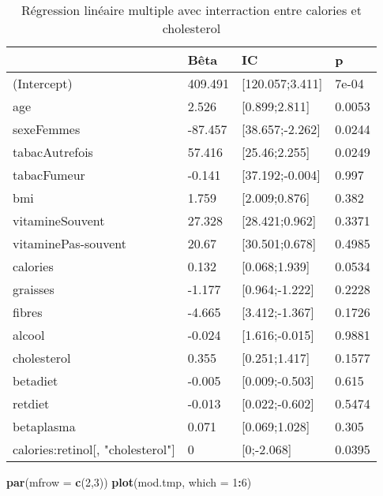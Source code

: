 \documentclass[]{article}
\newenvironment{Shaded}{\begin{snugshade}}{\end{snugshade}}
\newcommand{\KeywordTok}[1]{\textcolor[rgb]{0.13,0.29,0.53}{\textbf{#1}}}
\newcommand{\DataTypeTok}[1]{\textcolor[rgb]{0.13,0.29,0.53}{#1}}
\newcommand{\DecValTok}[1]{\textcolor[rgb]{0.00,0.00,0.81}{#1}}
\newcommand{\OperatorTok}[1]{\textcolor[rgb]{0.81,0.36,0.00}{\textbf{#1}}}
\newcommand{\NormalTok}[1]{#1}
\begin{document}
\begin{table}

\caption{\label{tab:unnamed-chunk-74}Régression linéaire multiple avec interraction entre calories et cholesterol}
\centering
\begin{tabular}[t]{l|l|l|l}
\hline
  & Bêta & IC & p\\
\hline
\rowcolor[HTML]{BBD2E1}  (Intercept) & 409.491 & [120.057;3.411] & 7e-04\\
\hline
age & 2.526 & [0.899;2.811] & 0.0053\\
\hline
\rowcolor[HTML]{BBD2E1}  sexeFemmes & -87.457 & [38.657;-2.262] & 0.0244\\
\hline
tabacAutrefois & 57.416 & [25.46;2.255] & 0.0249\\
\hline
\rowcolor[HTML]{BBD2E1}  tabacFumeur & -0.141 & [37.192;-0.004] & 0.997\\
\hline
bmi & 1.759 & [2.009;0.876] & 0.382\\
\hline
\rowcolor[HTML]{BBD2E1}  vitamineSouvent & 27.328 & [28.421;0.962] & 0.3371\\
\hline
vitaminePas-souvent & 20.67 & [30.501;0.678] & 0.4985\\
\hline
\rowcolor[HTML]{BBD2E1}  calories & 0.132 & [0.068;1.939] & 0.0534\\
\hline
graisses & -1.177 & [0.964;-1.222] & 0.2228\\
\hline
\rowcolor[HTML]{BBD2E1}  fibres & -4.665 & [3.412;-1.367] & 0.1726\\
\hline
alcool & -0.024 & [1.616;-0.015] & 0.9881\\
\hline
\rowcolor[HTML]{BBD2E1}  cholesterol & 0.355 & [0.251;1.417] & 0.1577\\
\hline
betadiet & -0.005 & [0.009;-0.503] & 0.615\\
\hline
\rowcolor[HTML]{BBD2E1}  retdiet & -0.013 & [0.022;-0.602] & 0.5474\\
\hline
betaplasma & 0.071 & [0.069;1.028] & 0.305\\
\hline
\rowcolor[HTML]{BBD2E1}  calories:retinol[, "cholesterol"] & 0 & [0;-2.068] & 0.0395\\
\hline
\end{tabular}
\end{table}

\begin{Shaded}
\begin{Highlighting}[]
\KeywordTok{par}\NormalTok{(}\DataTypeTok{mfrow =} \KeywordTok{c}\NormalTok{(}\DecValTok{2}\NormalTok{,}\DecValTok{3}\NormalTok{))}
\KeywordTok{plot}\NormalTok{(mod.tmp, }\DataTypeTok{which =} \DecValTok{1}\OperatorTok{:}\DecValTok{6}\NormalTok{)}
\end{Highlighting}
\end{Shaded}
\end{document}
